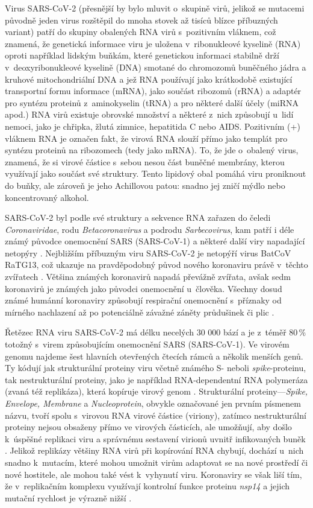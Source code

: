 Virus SARS-CoV-2 (přesnější by bylo mluvit o~skupině virů, jelikož se mutacemi původně jeden virus rozštěpil do mnoha stovek až tisíců blízce příbuzných variant) patří do skupiny obalených RNA virů s~pozitivním vláknem, což znamená, že genetická informace viru je uložena v~ribonukleové kyselině (RNA) oproti například lidským buňkám, které genetickou informaci stabilně drží v~deoxyribonukleové kyselině (DNA) smotané do chromozomů buněčného jádra a kruhové mitochondriální DNA a jež RNA používají jako krátkodobě existující transportní formu informace (mRNA), jako součást ribozomů (rRNA) a adaptér pro syntézu proteinů z~aminokyselin (tRNA) a pro některé další účely (miRNA apod.) RNA virů existuje obrovské množství a některé z~nich způsobují u~lidí nemoci, jako je chřipka, žlutá zimnice, hepatitida C nebo AIDS. Pozitivním (+) vláknem RNA je označen fakt, že virová RNA slouží přímo jako templát pro syntézu proteinů na ribozomech (tedy jako mRNA). To, že jde o~obalený virus, znamená, že si virové částice s~sebou nesou část buněčné membrány, kterou využívají jako součást své struktury. Tento lipidový obal pomáhá viru proniknout do buňky, ale zároveň je jeho Achillovou patou: snadno jej zničí mýdlo nebo koncentrovaný alkohol.

SARS-CoV-2 byl podle své struktury a sekvence RNA zařazen do čeledi \textit{Coronaviridae}, rodu \textit{Betacoronavirus} a podrodu \textit{Sarbecovirus}, kam patří i déle známý původce onemocnění SARS (SARS-CoV-1) a některé další viry napadající netopýry \cite{Zhou:2020,Lu:2020a}. Nejbližším příbuzným viru SARS-CoV-2 je netopýří virus BatCoV RaTG13, což ukazuje na pravděpodobný původ nového koronaviru právě v~těchto zvířatech \cite{Chan:2020,Hu:2021}. Většina známých koronavirů napadá převážně zvířata, avšak sedm koronavirů je známých jako původci onemocnění u~člověka. Všechny dosud známé humánní koronaviry způsobují respirační onemocnění s~příznaky od mírného nachlazení až po potenciálně závažné záněty průdušinek či plic \cite{Wevers:2009}.

Řetězec RNA viru SARS-CoV-2 má délku necelých 30 000 bází a je z~téměř 80\,\% totožný s~virem způsobujícím onemocnění SARS (SARS-CoV-1). Ve virovém genomu najdeme šest hlavních otevřených čtecích rámců a několik menších genů. Ty kódují jak strukturální proteiny viru včetně známého S- neboli \textit{spike}-proteinu, tak nestrukturální proteiny, jako je například RNA-dependentní RNA polymeráza (zvaná též replikáza), která kopíruje virový genom \cite{Chan:2020}. Strukturální proteiny---\textit{Spike, Envelope, Membrane} a \textit{Nucleoprotein}, obvykle označované jen prvním pís\-me\-nem názvu, tvoří spolu s~virovou RNA virové částice (viriony), zatímco nestrukturální proteiny nejsou obsaženy přímo ve virových částicích, ale umožňují, aby došlo k~ú\-spěš\-né replikaci viru a správnému sestavení virionů uvnitř infikovaných buněk \cite{Mittal:2020}. Jelikož replikázy většiny RNA virů při kopírování RNA chybují, dochází u~nich snadno k~mutacím, které mohou umožnit virům adaptovat se na nové prostředí či nové hostitele, ale mohou také vést k~vyhynutí viru. Koronaviry se však liší tím, že v~replikačním komplexu využívají kontrolní funkce proteinu \textit{nsp14} a jejich mutační rychlost je výrazně nižší \cite{Robson:2020}.

